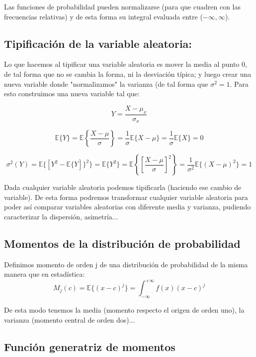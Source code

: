 \documentclass[12pt,a4paper]{book}
\newcommand{\E}{\mathbb{E}}
\newcommand{\EE}[1]{ \mathbb{E} \{ #1 \}  }
\newcommand{\EEE}[1]{\mathbb{E} \left\lbrace #1 \right\rbrace}
\newcommand{\corchetes}[1]{\{ #1 \}}
\begin{document}
 
 

Las funciones de probabilidad pueden normalizarse (para que cuadren con las frecuencias relativas) y de esta forma su integral evaluada entre ($-\infty, \infty$). \\
  

\subsection{Tipificación de la variable aleatoria: \label{Subsec:2-tipificacion}}

Lo que hacemos al tipificar una variable aleatoria es mover la media al punto 0, de tal forma que no se cambia la forma,  ni la desviación típica; y luego crear una nueva variable donde "normalizamos" la varianza (de tal forma que $\sigma^2 = 1$. Para esto construimos una nueva variable tal que:

\begin{equation}
Y = \dfrac{X-\mu_x}{\sigma_x}
\end{equation}

$$ \E \corchetes{Y} =  \E \left\lbrace \dfrac{X - \mu}{\sigma} \right\rbrace  = \frac{1}{\sigma} \E \corchetes{X-\mu} =  \frac{1}{\sigma} \E \corchetes{X}  = 0  $$

$$ \sigma^2 (Y) = \EE{[Y^2- \EE{Y]}^2} = \EE{Y^2}  = \EEE{ \left[ \dfrac{X - \mu}{\sigma} \right] ^2} = \dfrac{1}{\sigma^2} \EE{(X- \mu)^2} = 1   $$

Dada cualquier variable aleatoria podemos tipificarla (haciendo ese cambio de variable). De esta forma podremos transformar cualquier variable aleatoria para poder así comparar variables aleatorias con diferente media y varianza, pudiendo caracterizar la dispersión, asimetría...

\subsection{Momentos de la distribución de probabilidad}

Definimos momento de orden j de una distribución de probabilidad de la misma manera que en estadística:
\begin{equation}
M_j (c) =  \E \{(x-c)^j\} = \int_{-\infty}^{+\infty} f(x)(x-c)^j
\end{equation}

De esta modo tenemos la media (momento respecto el origen de orden uno), la varianza (momento central de orden dos)...\\

\subsection{Función generatriz de momentos}
\end{document}
